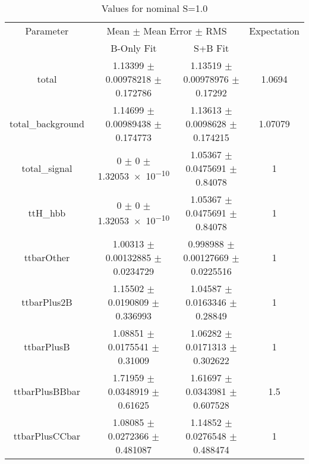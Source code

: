 \begin{table}
\centering
\caption{Values for nominal S=1.0}
\begin{tabular}{cccc}
\toprule
Parameter & \multicolumn{2}{c}{Mean $\pm$ Mean Error $\pm$ RMS} & Expectation\\
 & B-Only Fit & S+B Fit & \\
\midrule
total & \num{1.13399} $\pm$ \num{0.00978218} $\pm$ \num{0.172786} & \num{1.13519} $\pm$ \num{0.00978976} $\pm$ \num{0.17292} & \num{1.0694}\\
total\_background & \num{1.14699} $\pm$ \num{0.00989438} $\pm$ \num{0.174773} & \num{1.13613} $\pm$ \num{0.0098628} $\pm$ \num{0.174215} & \num{1.07079}\\
total\_signal & \num{0} $\pm$ \num{0} $\pm$ \num{1.32053e-10} & \num{1.05367} $\pm$ \num{0.0475691} $\pm$ \num{0.84078} & \num{1}\\
ttH\_hbb & \num{0} $\pm$ \num{0} $\pm$ \num{1.32053e-10} & \num{1.05367} $\pm$ \num{0.0475691} $\pm$ \num{0.84078} & \num{1}\\
ttbarOther & \num{1.00313} $\pm$ \num{0.00132885} $\pm$ \num{0.0234729} & \num{0.998988} $\pm$ \num{0.00127669} $\pm$ \num{0.0225516} & \num{1}\\
ttbarPlus2B & \num{1.15502} $\pm$ \num{0.0190809} $\pm$ \num{0.336993} & \num{1.04587} $\pm$ \num{0.0163346} $\pm$ \num{0.28849} & \num{1}\\
ttbarPlusB & \num{1.08851} $\pm$ \num{0.0175541} $\pm$ \num{0.31009} & \num{1.06282} $\pm$ \num{0.0171313} $\pm$ \num{0.302622} & \num{1}\\
ttbarPlusBBbar & \num{1.71959} $\pm$ \num{0.0348919} $\pm$ \num{0.61625} & \num{1.61697} $\pm$ \num{0.0343981} $\pm$ \num{0.607528} & \num{1.5}\\
ttbarPlusCCbar & \num{1.08085} $\pm$ \num{0.0272366} $\pm$ \num{0.481087} & \num{1.14852} $\pm$ \num{0.0276548} $\pm$ \num{0.488474} & \num{1}\\
\bottomrule
\end{tabular}
\end{table}